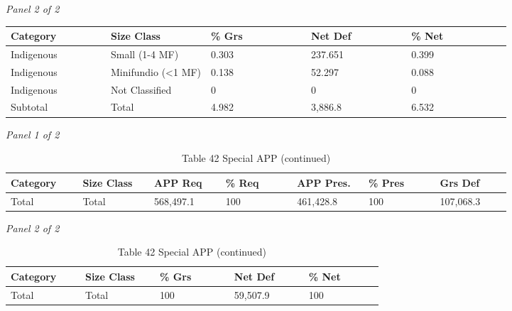 \documentclass[12pt]{article}
\begin{document}
\begin{landscape}
\begin{table}[H]
\textit{Panel 2 of 2}\\[2pt]
{\fontsize{12}{14}\selectfont
\setlength{\tabcolsep}{3pt}
\renewcommand{\arraystretch}{1.08}
\begin{tabular}{p{0.164\linewidth}p{0.164\linewidth}p{0.164\linewidth}p{0.164\linewidth}p{0.164\linewidth}}
\toprule
Category & Size Class & \% Grs & Net Def & \% Net \\
\midrule
Indigenous & Small (1-4 MF) & 0.303 & 237.651 & 0.399 \\
Indigenous & Minifundio (<1 MF) & 0.138 & 52.297 & 0.088 \\
Indigenous & Not Classified & 0 & 0 & 0 \\
Subtotal & Total & 4.982 & 3,886.8 & 6.532 \\
\bottomrule
\end{tabular}
}
\end{table}
\begin{table}[H]
\centering
\caption{Table 42 Special APP (continued)}
\textit{Panel 1 of 2}\\[2pt]
{\fontsize{12}{14}\selectfont
\setlength{\tabcolsep}{3pt}
\renewcommand{\arraystretch}{1.08}
\begin{tabular}{p{0.117\linewidth}p{0.117\linewidth}p{0.117\linewidth}p{0.117\linewidth}p{0.117\linewidth}p{0.117\linewidth}p{0.117\linewidth}}
\toprule
Category & Size Class & APP Req & \% Req & APP Pres. & \% Pres & Grs Def \\
\midrule
Total & Total & 568,497.1 & 100 & 461,428.8 & 100 & 107,068.3 \\
\bottomrule
\end{tabular}
}

\vspace{0.6em}

\textit{Panel 2 of 2}\\[2pt]
{\fontsize{12}{14}\selectfont
\setlength{\tabcolsep}{3pt}
\renewcommand{\arraystretch}{1.08}
\begin{tabular}{p{0.164\linewidth}p{0.164\linewidth}p{0.164\linewidth}p{0.164\linewidth}p{0.164\linewidth}}
\toprule
Category & Size Class & \% Grs & Net Def & \% Net \\
\midrule
Total & Total & 100 & 59,507.9 & 100 \\
\bottomrule
\end{tabular}
}
\end{table}
\end{landscape}
\end{document}
